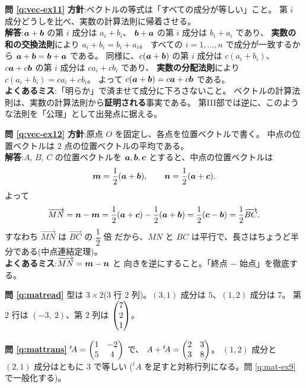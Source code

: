 \bigskip
\noindent\textbf{問 \ref{q:vec-ex11}}\quad
\textbf{方針}:ベクトルの等式は「すべての成分が等しい」こと。
第 $i$ 成分どうしを比べ、実数の計算法則に帰着させる。\\
\textbf{解答}:$\bm{a} + \bm{b}$ の第 $i$ 成分は $a_i + b_i$、
$\bm{b} + \bm{a}$ の第 $i$ 成分は $b_i + a_i$ であり、
\textbf{実数の和の交換法則}により $a_i + b_i = b_i + a_i$。
すべての $i = 1, \dots, n$ で成分が一致するから
$\bm{a} + \bm{b} = \bm{b} + \bm{a}$ である。
同様に、$c(\bm{a} + \bm{b})$ の第 $i$ 成分は $c(a_i + b_i)$、
$c\bm{a} + c\bm{b}$ の第 $i$ 成分は $ca_i + cb_i$ であり、
\textbf{実数の分配法則}により $c(a_i + b_i) = ca_i + cb_i$。
よって $c(\bm{a} + \bm{b}) = c\bm{a} + c\bm{b}$ である。\\
\textbf{よくあるミス}:「明らか」で済ませて成分に下ろさないこと。
ベクトルの計算法則は、実数の計算法則から\textbf{証明される}事実である。
第III部では逆に、このような法則を「公理」として出発点に据える。

\bigskip
\noindent\textbf{問 \ref{q:vec-ex12}}\quad
\textbf{方針}:原点 $O$ を固定し、各点を位置ベクトルで書く。
中点の位置ベクトルは $2$ 点の位置ベクトルの平均である。\\
\textbf{解答}:$A$, $B$, $C$ の位置ベクトルを $\bm{a}, \bm{b}, \bm{c}$
とすると、中点の位置ベクトルは
\[
\bm{m} = \frac{1}{2}(\bm{a} + \bm{b}), \qquad
\bm{n} = \frac{1}{2}(\bm{a} + \bm{c}).
\]
よって
\[
\overrightarrow{MN} = \bm{n} - \bm{m}
= \frac{1}{2}(\bm{a} + \bm{c}) - \frac{1}{2}(\bm{a} + \bm{b})
= \frac{1}{2}(\bm{c} - \bm{b})
= \frac{1}{2}\overrightarrow{BC}.
\]
すなわち $\overrightarrow{MN}$ は $\overrightarrow{BC}$ の $\dfrac{1}{2}$ 倍
だから、$MN$ と $BC$ は平行で、長さはちょうど半分である(中点連結定理)。\\
\textbf{よくあるミス}:$\overrightarrow{MN} = \bm{m} - \bm{n}$ と
向きを逆にすること。「終点 $-$ 始点」を徹底する。

\bigskip
\noindent\textbf{問 \ref{q:matread}}\quad
型は $3 \times 2$($3$ 行 $2$ 列)。$(3,1)$ 成分は $5$、$(1,2)$ 成分は $7$。
第 $2$ 行は $(-3,\ 2)$、第 $2$ 列は $\begin{pmatrix}7 \\ 2 \\ 1\end{pmatrix}$。

\bigskip
\noindent\textbf{問 \ref{q:mattrans}}\quad
${}^t\!A = \begin{pmatrix}1 & -2 \\ 5 & 4\end{pmatrix}$ で、
$A + {}^t\!A = \begin{pmatrix}2 & 3 \\ 3 & 8\end{pmatrix}$。
$(1,2)$ 成分と $(2,1)$ 成分はともに $3$ で等しい
(${}^t\!A$ を足すと対称行列になる。問 \ref{q:mat-ex9} で一般化する)。


